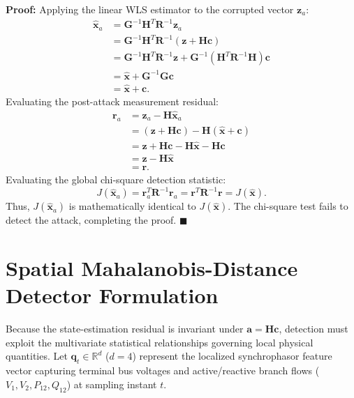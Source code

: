 \documentclass[12pt,a4paper]{report}
\begin{document}
\noindent\textbf{Proof:}
Applying the linear WLS estimator to the corrupted vector $\boldsymbol{z}_a$:
\begin{align}
\hat{\boldsymbol{x}}_a &= \boldsymbol{G}^{-1} \boldsymbol{H}^T \boldsymbol{R}^{-1} \boldsymbol{z}_a \nonumber \\
&= \boldsymbol{G}^{-1} \boldsymbol{H}^T \boldsymbol{R}^{-1} (\boldsymbol{z} + \boldsymbol{H}\boldsymbol{c}) \nonumber \\
&= \boldsymbol{G}^{-1} \boldsymbol{H}^T \boldsymbol{R}^{-1} \boldsymbol{z} + \boldsymbol{G}^{-1} (\boldsymbol{H}^T \boldsymbol{R}^{-1} \boldsymbol{H})\boldsymbol{c} \nonumber \\
&= \hat{\boldsymbol{x}} + \boldsymbol{G}^{-1}\boldsymbol{G}\boldsymbol{c} \nonumber \\
&= \hat{\boldsymbol{x}} + \boldsymbol{c}.
\end{align}
Evaluating the post-attack measurement residual:
\begin{align}
\boldsymbol{r}_a &= \boldsymbol{z}_a - \boldsymbol{H}\hat{\boldsymbol{x}}_a \nonumber \\
&= (\boldsymbol{z} + \boldsymbol{H}\boldsymbol{c}) - \boldsymbol{H}(\hat{\boldsymbol{x}} + \boldsymbol{c}) \nonumber \\
&= \boldsymbol{z} + \boldsymbol{H}\boldsymbol{c} - \boldsymbol{H}\hat{\boldsymbol{x}} - \boldsymbol{H}\boldsymbol{c} \nonumber \\
&= \boldsymbol{z} - \boldsymbol{H}\hat{\boldsymbol{x}} \nonumber \\
&= \boldsymbol{r}.
\end{align}
Evaluating the global chi-square detection statistic:
\begin{equation}
J(\hat{\boldsymbol{x}}_a) = \boldsymbol{r}_a^T \boldsymbol{R}^{-1} \boldsymbol{r}_a = \boldsymbol{r}^T \boldsymbol{R}^{-1} \boldsymbol{r} = J(\hat{\boldsymbol{x}}).
\end{equation}
Thus, $J(\hat{\boldsymbol{x}}_a)$ is mathematically identical to $J(\hat{\boldsymbol{x}})$. The
chi-square test fails to detect the attack, completing the proof. \hfill $\blacksquare$

\section{Spatial Mahalanobis-Distance Detector Formulation}
Because the state-estimation residual is invariant under $\boldsymbol{a} = \boldsymbol{H}\boldsymbol{c}$,
detection must exploit the multivariate statistical relationships governing local physical
quantities. Let $\boldsymbol{q}_t \in \mathbb{R}^d$ ($d=4$) represent the localized synchrophasor
feature vector capturing terminal bus voltages and active/reactive branch flows ($V_1, V_2, P_{12}, Q_{12}$)
at sampling instant $t$.
\end{document}
